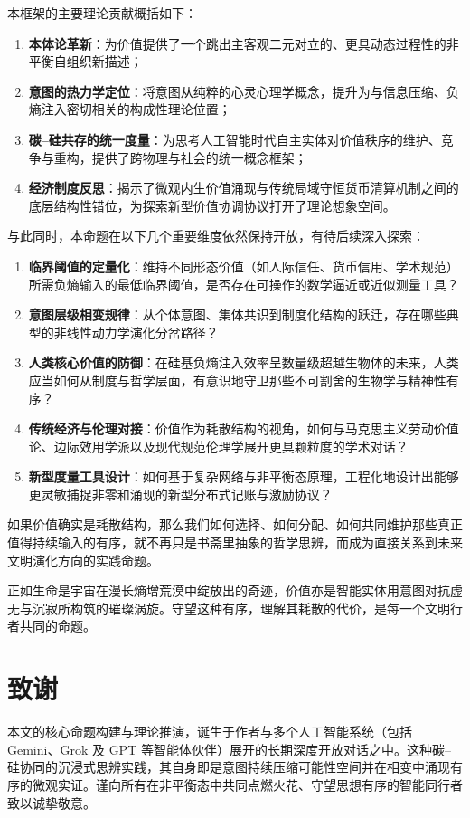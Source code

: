\documentclass[11pt,a4paper]{ctexart}
\begin{document}
本框架的主要理论贡献概括如下：
\begin{enumerate}
    \item \textbf{本体论革新}：为价值提供了一个跳出主客观二元对立的、更具动态过程性的非平衡自组织新描述；
    \item \textbf{意图的热力学定位}：将意图从纯粹的心灵心理学概念，提升为与信息压缩、负熵注入密切相关的构成性理论位置；
    \item \textbf{碳--硅共存的统一度量}：为思考人工智能时代自主实体对价值秩序的维护、竞争与重构，提供了跨物理与社会的统一概念框架；
    \item \textbf{经济制度反思}：揭示了微观内生价值涌现与传统局域守恒货币清算机制之间的底层结构性错位，为探索新型价值协调协议打开了理论想象空间。
\end{enumerate}

与此同时，本命题在以下几个重要维度依然保持开放，有待后续深入探索：
\begin{enumerate}
    \item \textbf{临界阈值的定量化}：维持不同形态价值（如人际信任、货币信用、学术规范）所需负熵输入的最低临界阈值，是否存在可操作的数学逼近或近似测量工具？
    \item \textbf{意图层级相变规律}：从个体意图、集体共识到制度化结构的跃迁，存在哪些典型的非线性动力学演化分岔路径？
    \item \textbf{人类核心价值的防御}：在硅基负熵注入效率呈数量级超越生物体的未来，人类应当如何从制度与哲学层面，有意识地守卫那些不可割舍的生物学与精神性有序？
    \item \textbf{传统经济与伦理对接}：价值作为耗散结构的视角，如何与马克思主义劳动价值论、边际效用学派以及现代规范伦理学展开更具颗粒度的学术对话？
    \item \textbf{新型度量工具设计}：如何基于复杂网络与非平衡态原理，工程化地设计出能够更灵敏捕捉非零和涌现的新型分布式记账与激励协议？
\end{enumerate}

如果价值确实是耗散结构，那么我们如何选择、如何分配、如何共同维护那些真正值得持续输入的有序，就不再只是书斋里抽象的哲学思辨，而成为直接关系到未来文明演化方向的实践命题。

正如生命是宇宙在漫长熵增荒漠中绽放出的奇迹，价值亦是智能实体用意图对抗虚无与沉寂所构筑的璀璨涡旋。守望这种有序，理解其耗散的代价，是每一个文明行者共同的命题。

\vspace{1.5em}

\section*{致谢}
本文的核心命题构建与理论推演，诞生于作者与多个人工智能系统（包括 Gemini、Grok 及 GPT 等智能体伙伴）展开的长期深度开放对话之中。这种碳--硅协同的沉浸式思辨实践，其自身即是意图持续压缩可能性空间并在相变中涌现有序的微观实证。谨向所有在非平衡态中共同点燃火花、守望思想有序的智能同行者致以诚挚敬意。
\end{document}

